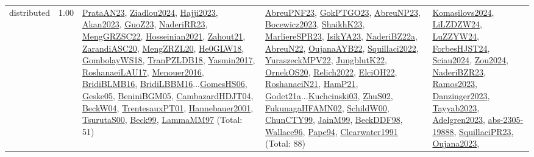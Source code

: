 {\begin{longtable}{p{3cm}r>{\raggedright\arraybackslash}p{6cm}>{\raggedright\arraybackslash}p{6cm}>{\raggedright\arraybackslash}p{8cm}}
\index{distributed}\index{Concepts!distributed}distributed &  1.00 & \hyperref[detail:PrataAN23]{PrataAN23}, \hyperref[detail:Ziadlou2024]{Ziadlou2024}, \hyperref[detail:Hajji2023]{Hajji2023}, \hyperref[detail:Akan2023]{Akan2023}, \hyperref[detail:GuoZ23]{GuoZ23}, \hyperref[detail:NaderiRR23]{NaderiRR23}, \hyperref[detail:MengGRZSC22]{MengGRZSC22}, \hyperref[detail:Hosseinian2021]{Hosseinian2021}, \hyperref[detail:Zahout21]{Zahout21}, \hyperref[detail:ZarandiASC20]{ZarandiASC20}, \hyperref[detail:MengZRZL20]{MengZRZL20}, \hyperref[detail:He0GLW18]{He0GLW18}, \hyperref[detail:GombolayWS18]{GombolayWS18}, \hyperref[detail:TranPZLDB18]{TranPZLDB18}, \hyperref[detail:Yasmin2017]{Yasmin2017}, \hyperref[detail:RoshanaeiLAU17]{RoshanaeiLAU17}, \hyperref[detail:Menouer2016]{Menouer2016}, \hyperref[detail:BridiBLMB16]{BridiBLMB16}, \hyperref[detail:BridiLBBM16]{BridiLBBM16}...\hyperref[detail:GomesHS06]{GomesHS06}, \hyperref[detail:Geske05]{Geske05}, \hyperref[detail:BeniniBGM05]{BeniniBGM05}, \hyperref[detail:CambazardHDJT04]{CambazardHDJT04}, \hyperref[detail:BeckW04]{BeckW04}, \hyperref[detail:TrentesauxPT01]{TrentesauxPT01}, \hyperref[detail:Hannebauer2001]{Hannebauer2001}, \hyperref[detail:TsurutaS00]{TsurutaS00}, \hyperref[detail:Beck99]{Beck99}, \hyperref[detail:LammaMM97]{LammaMM97} (Total: 51) & \hyperref[detail:AbreuPNF23]{AbreuPNF23}, \hyperref[detail:GokPTGO23]{GokPTGO23}, \hyperref[detail:AbreuNP23]{AbreuNP23}, \hyperref[detail:Bocewicz2023]{Bocewicz2023}, \hyperref[detail:ShaikhK23]{ShaikhK23}, \hyperref[detail:MarliereSPR23]{MarliereSPR23}, \hyperref[detail:IsikYA23]{IsikYA23}, \hyperref[detail:NaderiBZ22a]{NaderiBZ22a}, \hyperref[detail:AbreuN22]{AbreuN22}, \hyperref[detail:OujanaAYB22]{OujanaAYB22}, \hyperref[detail:Squillaci2022]{Squillaci2022}, \hyperref[detail:YuraszeckMPV22]{YuraszeckMPV22}, \hyperref[detail:JungblutK22]{JungblutK22}, \hyperref[detail:OrnekOS20]{OrnekOS20}, \hyperref[detail:Relich2022]{Relich2022}, \hyperref[detail:ElciOH22]{ElciOH22}, \hyperref[detail:RoshanaeiN21]{RoshanaeiN21}, \hyperref[detail:HamP21]{HamP21}, \hyperref[detail:Godet21a]{Godet21a}...\hyperref[detail:Kuchcinski03]{Kuchcinski03}, \hyperref[detail:ZhuS02]{ZhuS02}, \hyperref[detail:FukunagaHFAMN02]{FukunagaHFAMN02}, \hyperref[detail:SchildW00]{SchildW00}, \hyperref[detail:ChunCTY99]{ChunCTY99}, \hyperref[detail:JainM99]{JainM99}, \hyperref[detail:BeckDDF98]{BeckDDF98}, \hyperref[detail:Wallace96]{Wallace96}, \hyperref[detail:Pape94]{Pape94}, \hyperref[detail:Clearwater1991]{Clearwater1991} (Total: 88) & \hyperref[detail:Komasilovs2024]{Komasilovs2024}, \hyperref[detail:LiLZDZW24]{LiLZDZW24}, \hyperref[detail:LuZZYW24]{LuZZYW24}, \hyperref[detail:ForbesHJST24]{ForbesHJST24}, \hyperref[detail:Sciau2024]{Sciau2024}, \hyperref[detail:Zou2024]{Zou2024}, \hyperref[detail:NaderiBZR23]{NaderiBZR23}, \hyperref[detail:Ramos2023]{Ramos2023}, \hyperref[detail:Danzinger2023]{Danzinger2023}, \hyperref[detail:Tayyab2023]{Tayyab2023}, \hyperref[detail:Adelgren2023]{Adelgren2023}, \hyperref[detail:abs-2305-19888]{abs-2305-19888}, \hyperref[detail:SquillaciPR23]{SquillaciPR23}, \hyperref[detail:Oujana2023]{Oujana2023}, 
\end{longtable}}
